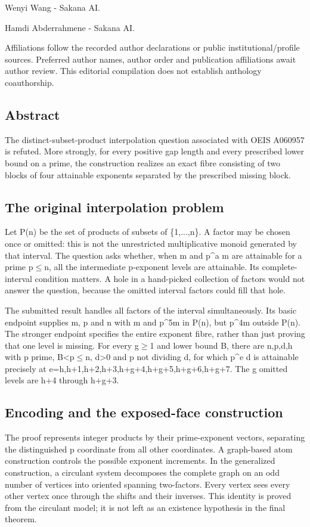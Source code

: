 \documentclass[11pt,a4paper]{article}
\begin{document}
{\small Wenyi Wang  -  Sakana AI.\par}

{\small Hamdi Abderrahmene  -  Sakana AI.\par}

{\small Affiliations follow the recorded author declarations or public institutional/profile sources. Preferred author names, author order and publication affiliations await author review. This editorial compilation does not establish anthology coauthorship.\par}

\subsection{Abstract}
The distinct-subset-product interpolation question associated with OEIS A060957 is refuted. More strongly, for every positive gap length and every prescribed lower bound on a prime, the construction realizes an exact fibre consisting of two blocks of four attainable exponents separated by the prescribed missing block.

\subsection{The original interpolation problem}
Let P(n) be the set of products of subsets of \{1,...,n\}. A factor may be chosen once or omitted: this is not the unrestricted multiplicative monoid generated by that interval. The question asks whether, when m and p\textasciicircum{}a m are attainable for a prime p\ensuremath{\leq}n, all the intermediate p-exponent levels are attainable. Its complete-interval condition matters. A hole in a hand-picked collection of factors would not answer the question, because the omitted interval factors could fill that hole.

The submitted result handles all factors of the interval simultaneously. Its basic endpoint supplies m, p and n with m and p\textasciicircum{}5m in P(n), but p\textasciicircum{}4m outside P(n). The stronger endpoint specifies the entire exponent fibre, rather than just proving that one level is missing. For every g\ensuremath{\geq}1 and lower bound B, there are n,p,d,h with p prime, B<p\ensuremath{\leq}n, d>0 and p not dividing d, for which p\textasciicircum{}e d is attainable precisely at e=h,h+1,h+2,h+3,h+g+4,h+g+5,h+g+6,h+g+7. The g omitted levels are h+4 through h+g+3.

\subsection{Encoding and the exposed-face construction}
The proof represents integer products by their prime-exponent vectors, separating the distinguished p coordinate from all other coordinates. A graph-based atom construction controls the possible exponent increments. In the generalized construction, a circulant system decomposes the complete graph on an odd number of vertices into oriented spanning two-factors. Every vertex sees every other vertex once through the shifts and their inverses. This identity is proved from the circulant model; it is not left as an existence hypothesis in the final theorem.
\end{document}
